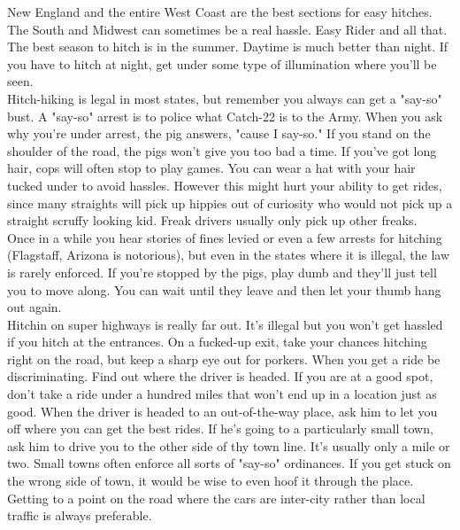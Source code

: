 \documentclass[11pt,twoside,a4paper]{book}
\begin{document}
New England and the entire West Coast are the best sections for easy hitches. The South and Midwest can sometimes be a real hassle. Easy Rider and all that. The best season to hitch is in the summer. Daytime is much better than night. If you have to hitch at night, get under some type of illumination where you'll be seen.~\\

Hitch-hiking is legal in most states, but remember you always can get a "say-so" bust. A "say-so" arrest is to police what Catch-22 is to the Army. When you ask why you're under arrest, the pig answers, "cause I say-so." If you stand on the shoulder of the road, the pigs won't give you too bad a time. If you've got long hair, cops will often stop to play games. You can wear a hat with your hair tucked under to avoid hassles. However this might hurt your ability to get rides, since many straights will pick up hippies out of curiosity who would not pick up a straight scruffy looking kid. Freak drivers usually only pick up other freaks.~\\

Once in a while you hear stories of fines levied or even a few arrests for hitching (Flagstaff, Arizona is notorious), but even in the states where it is illegal, the law is rarely enforced. If you're stopped by the pigs, play dumb and they'll just tell you to move along. You can wait until they leave and then let your thumb hang out again.~\\

Hitchin on super highways is really far out. It's illegal but you won't get hassled if you hitch at the entrances. On a fucked-up exit, take your chances hitching right on the road, but keep a sharp eye out for porkers. When you get a ride be discriminating. Find out where the driver is headed. If you are at a good spot, don't take a ride under a hundred miles that won't end up in a location just as good. When the driver is headed to an out-of-the-way place, ask him to let you off where you can get the best rides. If he's going to a particularly small town, ask him to drive you to the other side of thy town line. It's usually only a mile or two. Small towns often enforce all sorts of "say-so" ordinances. If you get stuck on the wrong side of town, it would be wise to even hoof it through the place. Getting to a point on the road where the cars are inter-city rather than local traffic is always preferable.~\\
\end{document}
